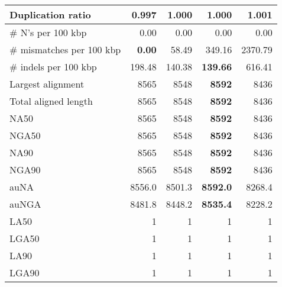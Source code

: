 \documentclass[12pt,a4paper]{article}
\begin{document}
\begin{table}[ht]
\begin{center}
\begin{tabular}{|l*{4}{|r}|}
Duplication ratio & {\bf 0.997} & 1.000 & 1.000 & 1.001 \\ \hline
\# N's per 100 kbp & 0.00 & 0.00 & 0.00 & 0.00 \\ \hline
\# mismatches per 100 kbp & {\bf 0.00} & 58.49 & 349.16 & 2370.79 \\ \hline
\# indels per 100 kbp & 198.48 & 140.38 & {\bf 139.66} & 616.41 \\ \hline
Largest alignment & 8565 & 8548 & {\bf 8592} & 8436 \\ \hline
Total aligned length & 8565 & 8548 & {\bf 8592} & 8436 \\ \hline
NA50 & 8565 & 8548 & {\bf 8592} & 8436 \\ \hline
NGA50 & 8565 & 8548 & {\bf 8592} & 8436 \\ \hline
NA90 & 8565 & 8548 & {\bf 8592} & 8436 \\ \hline
NGA90 & 8565 & 8548 & {\bf 8592} & 8436 \\ \hline
auNA & 8556.0 & 8501.3 & {\bf 8592.0} & 8268.4 \\ \hline
auNGA & 8481.8 & 8448.2 & {\bf 8535.4} & 8228.2 \\ \hline
LA50 & 1 & 1 & 1 & 1 \\ \hline
LGA50 & 1 & 1 & 1 & 1 \\ \hline
LA90 & 1 & 1 & 1 & 1 \\ \hline
LGA90 & 1 & 1 & 1 & 1 \\ \hline
\end{tabular}
\end{center}
\end{table}
\end{document}
